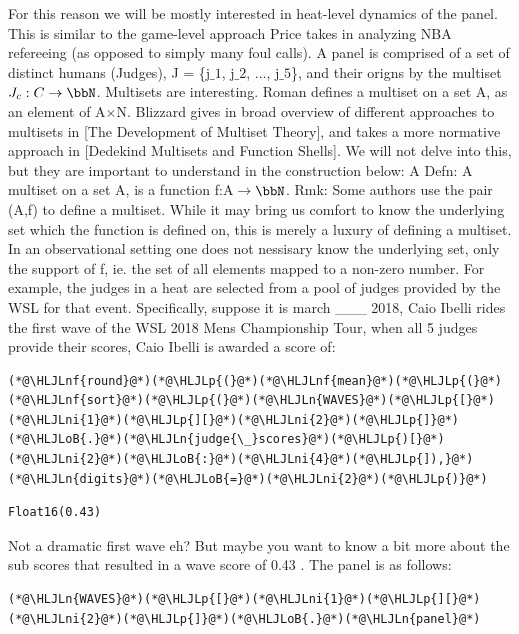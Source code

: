 \documentclass[12pt,a4paper]{article}
\newcommand{\HLJLn}[1]{#1}
\newcommand{\HLJLnf}[1]{\textcolor[RGB]{66,102,213}{#1}}
\newcommand{\HLJLni}[1]{\textcolor[RGB]{59,151,46}{#1}}
\newcommand{\HLJLoB}[1]{\textcolor[RGB]{102,102,102}{\textbf{#1}}}
\newcommand{\HLJLp}[1]{#1}
\begin{document}
For this reason we will be mostly interested in heat-level dynamics of the panel. This is similar to the game-level approach Price takes in analyzing NBA refereeing (as opposed to simply many foul calls). A panel is comprised of a set of distinct humans (Judges), J = \{j\ensuremath{\_1}, j\ensuremath{\_2}, ..., j\ensuremath{\_5}\}, and their origns by the multiset $J_c:C\ensuremath{\rightarrow}\ensuremath{\bbN}$. Multisets are interesting. Roman defines a multiset on a set A, as an element of A\ensuremath{\times}N. Blizzard gives in broad overview of different approaches to multisets in [The Development of Multiset Theory], and takes a more normative approach in [Dedekind Multisets and Function Shells]. We will not delve into this, but they are important to understand in the construction below: A Defn: A multiset on a set A, is a function f:A\ensuremath{\rightarrow}\ensuremath{\bbN}. Rmk: Some authors use the pair (A,f) to define a multiset. While it may bring us comfort to know the underlying set which the function is defined on, this is merely a luxury of defining a multiset. In an observational setting one does not nessisary know the underlying set, only the support of f, ie. the set of all elements mapped to a non-zero number. For example, the judges in a heat are selected from a pool of judges provided by the WSL for that event. Specifically, suppose it is march \_\_\_ 2018, Caio Ibelli rides the first wave of the WSL 2018 Mens Championship Tour, when all 5 judges provide their scores, Caio Ibelli is awarded a score of:


\begin{lstlisting}
(*@\HLJLnf{round}@*)(*@\HLJLp{(}@*)(*@\HLJLnf{mean}@*)(*@\HLJLp{(}@*)(*@\HLJLnf{sort}@*)(*@\HLJLp{(}@*)(*@\HLJLn{WAVES}@*)(*@\HLJLp{[}@*)(*@\HLJLni{1}@*)(*@\HLJLp{][}@*)(*@\HLJLni{2}@*)(*@\HLJLp{]}@*)(*@\HLJLoB{.}@*)(*@\HLJLn{judge{\_}scores}@*)(*@\HLJLp{)[}@*)(*@\HLJLni{2}@*)(*@\HLJLoB{:}@*)(*@\HLJLni{4}@*)(*@\HLJLp{]),}@*)(*@\HLJLn{digits}@*)(*@\HLJLoB{=}@*)(*@\HLJLni{2}@*)(*@\HLJLp{)}@*)
\end{lstlisting}

\begin{lstlisting}
Float16(0.43)
\end{lstlisting}


Not a dramatic first wave eh? But maybe you want to know a bit more about the sub scores that resulted in a wave score of 0.43 . The panel is as follows:


\begin{lstlisting}
(*@\HLJLn{WAVES}@*)(*@\HLJLp{[}@*)(*@\HLJLni{1}@*)(*@\HLJLp{][}@*)(*@\HLJLni{2}@*)(*@\HLJLp{]}@*)(*@\HLJLoB{.}@*)(*@\HLJLn{panel}@*)
\end{lstlisting}
\end{document}
